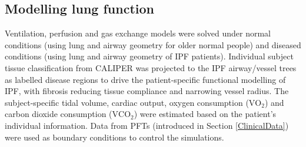 \begin{table}[htbp]
\begin{tabular}{p{2.0cm} p{4.5cm} p{3.8cm} p{3.2cm}}
\hline
\end{tabular}
\end{table}

\subsection{Modelling lung function}
Ventilation, perfusion and gas exchange models were solved under normal conditions (using lung and airway geometry for older normal people) and diseased conditions (using lung and airway geometry of IPF patients). Individual subject tissue classification from CALIPER was projected to the IPF airway/vessel trees as labelled disease regions to drive the patient-specific functional modelling of IPF, with fibrosis reducing tissue compliance and narrowing vessel radius. The subject-specific tidal volume, cardiac output, oxygen consumption ($\mathrm{VO_2}$) and carbon dioxide consumption ($\mathrm{VCO_2}$) were estimated based on the patient's individual information. Data from PFTs (introduced in Section \ref{ClinicalData}) were used as boundary conditions to control the simulations.

